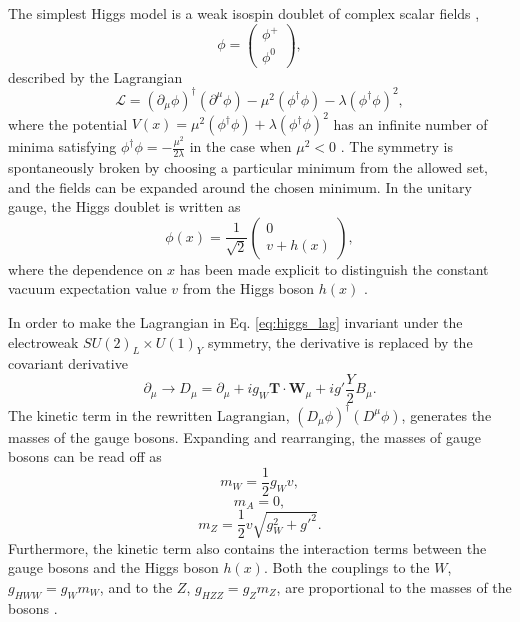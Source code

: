 The simplest Higgs model is a weak isospin doublet of complex scalar fields \cite{Thomson:2013zua},
\begin{equation}
\phi = \begin{pmatrix} \phi^+ \\ \phi^0 \end{pmatrix},
\end{equation}
described by the Lagrangian
\begin{equation}
\mathcal{L} = (\partial_\mu \phi)^\dag (\partial^\mu \phi) - \mu^2(\phi^\dag\phi) - \lambda(\phi^\dag \phi)^2,
\label{eq:higgs_lag}
\end{equation}
where the potential $V(x) = \mu^2(\phi^\dag\phi) + \lambda(\phi^\dag \phi)^2$
has an infinite number of minima satisfying $\phi^\dag \phi = -\frac{\mu^2}{2\lambda}$
in the case when $\mu^2 < 0$ \cite{Thomson:2013zua}. The symmetry is spontaneously broken by choosing a
particular minimum from the allowed set, and the fields can be expanded around the chosen minimum.
In the unitary gauge, the Higgs doublet is written as
\begin{equation}
\phi(x) = \frac{1}{\sqrt{2}} \begin{pmatrix} 0 \\ v + h(x) \end{pmatrix},
\end{equation}
where the dependence on $x$ has been made explicit to distinguish the constant
vacuum expectation value $v$ from the Higgs boson $h(x)$ \cite{Thomson:2013zua}.

In order to make the Lagrangian in Eq. \ref{eq:higgs_lag} invariant under the electroweak
$SU(2)_L \times U(1)_Y$ symmetry, the derivative is replaced by the covariant
derivative \cite{Thomson:2013zua}
\begin{equation}
\partial_\mu \rightarrow D_\mu = \partial_\mu + i g_W \mathbf{T} \cdot \mathbf{W}_\mu
+ i g' \frac{Y}{2} B_\mu.
\end{equation}
The kinetic term in the rewritten Lagrangian, $(D_\mu \phi)^\dag (D^\mu \phi)$, generates the
masses of the gauge bosons. Expanding and rearranging, the masses of gauge bosons can be read off as
\begin{equation}
m_W = \frac{1}{2} g_W v,
\end{equation}
\begin{equation}
m_A = 0,
\end{equation}
\begin{equation}
m_Z = \frac{1}{2}v\sqrt{g_W^2 + g'^2}.
\end{equation}
Furthermore, the kinetic term also contains the interaction terms between the gauge bosons
and the Higgs boson $h(x)$. Both the couplings to the $W$, $g_{HWW}=g_W m_W$, and to the $Z$,
$g_{HZZ} = g_Z m_Z$, are proportional to the masses of the bosons \cite{Thomson:2013zua}.

